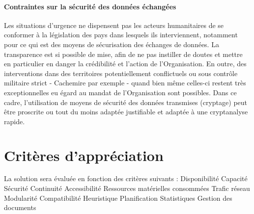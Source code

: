 \documentclass[11pt,fleqn]{book} %
\begin{document}
\paragraph{Contraintes sur la sécurité des données échangées}
Les situations d'urgence ne dispensent pas les acteurs humanitaires de se conformer à la législation des pays dans lesquels ils interviennent, notamment pour ce qui est des moyens de sécurisation des échanges de données. La transparence est si possible de mise, afin de ne pas instiller de doutes et mettre en particulier en danger la crédibilité et l'action de l'Organisation. En outre, des interventions dans des territoires potentiellement conflictuels ou sous contrôle militaire strict - Cachemire par exemple - quand bien même celles-ci restent très exceptionnelles eu égard au mandat de l'Organisation sont possibles. Dans ce cadre, l'utilisation de moyens de sécurité des données transmises (cryptage) peut être proscrite ou tout du moins adaptée justifiable et adaptée à une cryptanalyse \og{}rapide\fg{}.

\section{Critères d'appréciation}
La solution sera évaluée en fonction des critères suivants :
Disponibilité
Capacité
Sécurité
Continuité
Accessibilité
Ressources matérielles consommées
Trafic réseau
Modularité
Compatibilité
Heuristique
Planification
Statistiques
Gestion des documents
\end{document}
